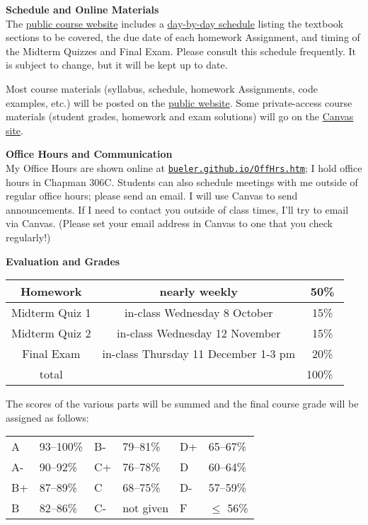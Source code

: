 \documentclass[12pt]{article}
\renewcommand{\emph}[1]{\textsf{\textbf{#1}}}
\newcommand{\localhead}[1]{\par\smallskip\textbf{#1} \smallskip\nobreak\\}%
\def\heading#1{\localhead{\large\emph{#1}}}
\begin{document}
\heading{Schedule and Online Materials}
The \href{https://bueler.github.io/nla/}{public course website} includes a \href{https://bueler.github.io/nla/assets/general/F25/schedule.pdf}{day-by-day schedule} listing the textbook sections to be covered, the due date of each homework Assignment, and timing of the Midterm Quizzes and Final Exam.  Please consult this schedule frequently.  It is subject to change, but it will be kept up to date.

Most course materials (syllabus, schedule, homework Assignments, code examples, etc.) will be posted on the \href{https://bueler.github.io/nla/}{public website}.  Some private-access course materials (student grades, homework and exam solutions) will go on the \href{https://canvas.alaska.edu/courses/27130}{Canvas site}.


\heading{Office Hours and Communication}
My Office Hours are shown online at \href{http://bueler.github.io/OffHrs.htm}{\texttt{bueler.github.io/OffHrs.htm}}; I hold office hours in Chapman 306C.  Students can also schedule meetings with me outside of regular office hours; please send an email.  I will use Canvas to send announcements.  If I need to contact you outside of class times, I'll try to email via Canvas.  (Please set your email address in Canvas to one that you check regularly!)


\clearpage\newpage
\phantom{foo}
\heading{Evaluation and Grades}
\vskip -10pt

\begin{tabular}{|c|c|c|}
\hline
Homework & nearly weekly & 50\% \\
\hline
Midterm Quiz 1 & in-class Wednesday 8 October  & 15\%  \\
\hline
Midterm Quiz 2 & in-class Wednesday 12 November & 15\%  \\
\hline
Final Exam     & in-class Thursday 11 December 1-3 pm & 20\% \\
\hline
total & & 100\% \, \\
\hline
\end{tabular}

The scores of the various parts will be summed and the final course grade will be assigned as follows:

\begin{tabular}{llllll}
A  & 93--100\% & B- & 79--81\%  & D+ & 65--67\%  \\
A- & 90--92\%  & C+ & 76--78\%  & D  & 60--64\%  \\
B+ & 87--89\%  & C  & 68--75\%  & D- & 57--59\%  \\
B  & 82--86\%  & C- & not given & F  & $\le$ 56\%
\end{tabular}
\end{document}
